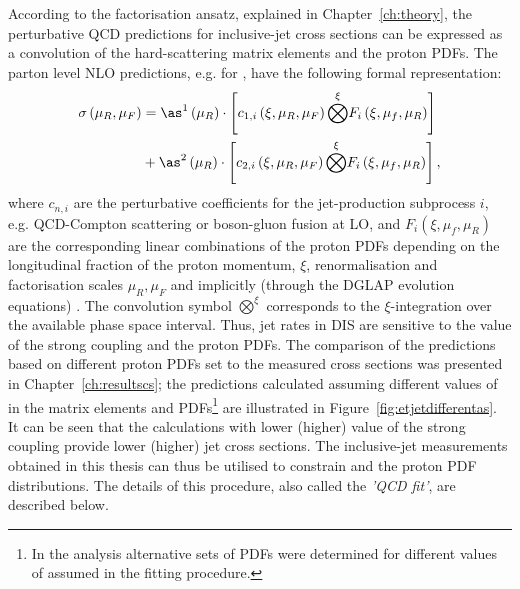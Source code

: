 According to the factorisation ansatz, explained in Chapter~\ref{ch:theory}, the perturbative QCD predictions for inclusive-jet cross sections can be expressed as a convolution of the hard-scattering matrix elements and the proton PDFs. The parton level NLO predictions, e.g. for \dsdetjetb, have the following formal representation:
\begin{equation}
	\begin{split}
\sigma\left( \mu_R, \mu_F\right)  &= \as^1\left( \mu_R\right) \cdot \left[ c_{1,i}\left( \xi, \mu_R, \mu_F\right) \overset{\xi}{\bigotimes } F_i\left( \xi, \mu_f, \mu_R \right) \right] \\
&+ \as^2\left( \mu_R\right) \cdot \left[ c_{2,i}\left( \xi, \mu_R, \mu_F\right) \overset{\xi}{\bigotimes } F_i\left( \xi, \mu_f, \mu_R \right) \right],
	\end{split}
	\label{eq:fitnloqcdpredictions}
\end{equation}
where $c_{n,i}$ are the perturbative coefficients for the jet-production subprocess $i$, e.g. QCD-Compton scattering or boson-gluon fusion at LO, and $F_i\left( \xi, \mu_f, \mu_R \right)$ are the corresponding linear combinations of the proton PDFs depending on the longitudinal fraction of the proton momentum, $\xi$, renormalisation and factorisation scales $\mu_R, \mu_F$ and implicitly (through the DGLAP evolution equations) \as. The convolution symbol $\overset{\xi}{\bigotimes}$ corresponds to the $\xi$-integration over the available phase space interval. Thus, jet rates in DIS are sensitive to the value of the strong coupling and the proton PDFs. The comparison of the predictions based on different proton PDFs set to the measured cross sections was presented in Chapter~\ref{ch:resultscs}; the predictions calculated assuming different values of \asz in the matrix elements and PDFs\footnote{In the  analysis alternative sets of PDFs were determined for different values of \asz assumed in the fitting procedure.} are illustrated in Figure~\ref{fig:etjetdifferentas}. It can be seen that the calculations with lower (higher) value of the strong coupling provide lower (higher) jet cross sections. %
The inclusive-jet measurements obtained in this thesis can thus be utilised to constrain \as and the proton PDF distributions. The details of this procedure, also called the \emph{'QCD fit'}, are described below.



